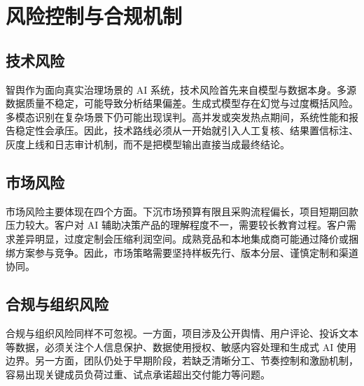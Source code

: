 \chapter{风险控制与合规机制}

\section{技术风险}

智舆作为面向真实治理场景的 AI 系统，技术风险首先来自模型与数据本身。多源数据质量不稳定，可能导致分析结果偏差。生成式模型存在幻觉与过度概括风险。多模态识别在复杂场景下仍可能出现误判。高并发或突发热点期间，系统性能和报告稳定性会承压。因此，技术路线必须从一开始就引入人工复核、结果置信标注、灰度上线和日志审计机制，而不是把模型输出直接当成最终结论。

\section{市场风险}

市场风险主要体现在四个方面。下沉市场预算有限且采购流程偏长，项目短期回款压力较大。客户对 AI 辅助决策产品的理解程度不一，需要较长教育过程。客户需求差异明显，过度定制会压缩利润空间。成熟竞品和本地集成商可能通过降价或捆绑方案参与竞争。因此，市场策略需要坚持样板先行、版本分层、谨慎定制和渠道协同。

\section{合规与组织风险}

合规与组织风险同样不可忽视。一方面，项目涉及公开舆情、用户评论、投诉文本等数据，必须关注个人信息保护、数据使用授权、敏感内容处理和生成式 AI 使用边界。另一方面，团队仍处于早期阶段，若缺乏清晰分工、节奏控制和激励机制，容易出现关键成员负荷过重、试点承诺超出交付能力等问题。

